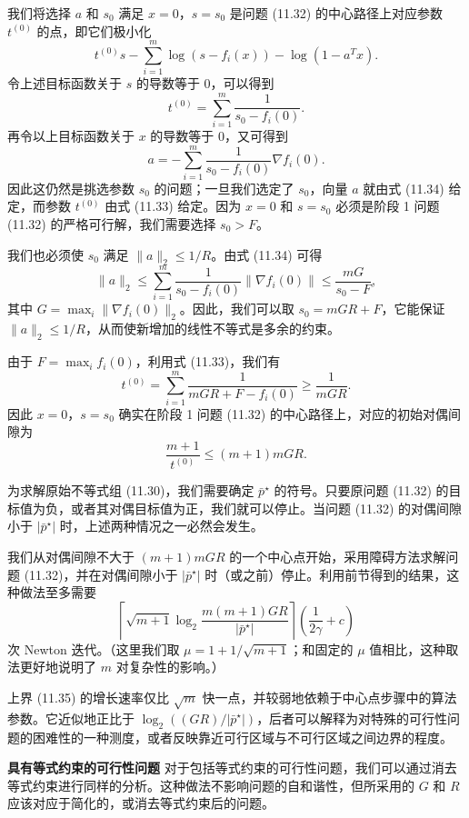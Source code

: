 \documentclass[UTF8,12pt,a4paper,fontset=fandol]{ctexart}
\begin{document}
我们将选择 $a$ 和 $s_0$ 满足 $x=0$，$s=s_0$ 是问题 (11.32) 的中心路径上对应参数 $t^{(0)}$ 的点，即它们极小化
\[
t^{(0)}s-\sum_{i=1}^m\log(s-f_i(x))-\log(1-a^Tx).
\]
令上述目标函数关于 $s$ 的导数等于 0，可以得到
\begin{equation}
t^{(0)}=\sum_{i=1}^m\frac{1}{s_0-f_i(0)}.
\tag{11.33}
\end{equation}
再令以上目标函数关于 $x$ 的导数等于 0，又可得到
\begin{equation}
a=-\sum_{i=1}^m\frac{1}{s_0-f_i(0)}\nabla f_i(0).
\tag{11.34}
\end{equation}
因此这仍然是挑选参数 $s_0$ 的问题；一旦我们选定了 $s_0$，向量 $a$ 就由式 (11.34) 给定，而参数 $t^{(0)}$ 由式 (11.33) 给定。因为 $x=0$ 和 $s=s_0$ 必须是阶段 1 问题 (11.32) 的严格可行解，我们需要选择 $s_0>F$。

我们也必须使 $s_0$ 满足 $\|a\|_2\leq 1/R$。由式 (11.34) 可得
\[
\|a\|_2\leq \sum_{i=1}^m\frac{1}{s_0-f_i(0)}\|\nabla f_i(0)\|\leq \frac{mG}{s_0-F},
\]
其中 $G=\max_i\|\nabla f_i(0)\|_2$。因此，我们可以取 $s_0=mGR+F$，它能保证 $\|a\|_2\leq 1/R$，从而使新增加的线性不等式是多余的约束。

由于 $F=\max_i f_i(0)$，利用式 (11.33)，我们有
\[
t^{(0)}=\sum_{i=1}^m\frac{1}{mGR+F-f_i(0)}\geq \frac{1}{mGR}.
\]
因此 $x=0$，$s=s_0$ 确实在阶段 1 问题 (11.32) 的中心路径上，对应的初始对偶间隙为
\[
\frac{m+1}{t^{(0)}}\leq (m+1)mGR.
\]

为求解原始不等式组 (11.30)，我们需要确定 $\bar{p}^\star$ 的符号。只要原问题 (11.32) 的目标值为负，或者其对偶目标值为正，我们就可以停止。当问题 (11.32) 的对偶间隙小于 $|\bar{p}^\star|$ 时，上述两种情况之一必然会发生。

我们从对偶间隙不大于 $(m+1)mGR$ 的一个中心点开始，采用障碍方法求解问题 (11.32)，并在对偶间隙小于 $|\bar{p}^\star|$ 时（或之前）停止。利用前节得到的结果，这种做法至多需要
\begin{equation}
\left\lceil\sqrt{m+1}\log_2\frac{m(m+1)GR}{|\bar{p}^\star|}\right\rceil
\left(\frac{1}{2\gamma}+c\right)
\tag{11.35}
\end{equation}
次 Newton 迭代。（这里我们取 $\mu=1+1/\sqrt{m+1}$；和固定的 $\mu$ 值相比，这种取法更好地说明了 $m$ 对复杂性的影响。）

上界 (11.35) 的增长速率仅比 $\sqrt{m}$ 快一点，并较弱地依赖于中心点步骤中的算法参数。它近似地正比于 $\log_2((GR)/|\bar{p}^\star|)$，后者可以解释为对特殊的可行性问题的困难性的一种测度，或者反映靠近可行区域与不可行区域之间边界的程度。

\noindent\textbf{具有等式约束的可行性问题}\quad
对于包括等式约束的可行性问题，我们可以通过消去等式约束进行同样的分析。这种做法不影响问题的自和谐性，但所采用的 $G$ 和 $R$ 应该对应于简化的，或消去等式约束后的问题。
\end{document}
